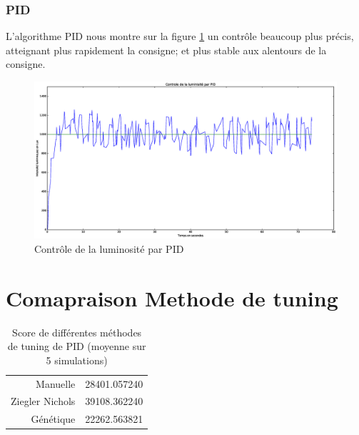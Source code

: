\documentclass[a4paper,10pt]{report}
\begin{document}
\subsubsection{PID}
L'algorithme PID nous montre sur la figure \ref{fig:pid} un contrôle beaucoup plus précis, atteignant plus rapidement la consigne; et plus stable aux alentours de la consigne.
\begin{figure}[hb!]
   \centering
   \includegraphics[scale=0.35]{PID.eps}
   \caption{\label{fig:pid} Contrôle de la luminosité par PID}
\end{figure}


\section{Comapraison Methode de tuning}
\begin{table}[h]
    \begin{center}
        \begin{tabular}{r l}
            Manuelle & 28401.057240\\
            Ziegler Nichols & 39108.362240\\
            Génétique & 22262.563821
        \end{tabular}
    \end{center}
    \caption{Score de différentes méthodes de tuning de PID (moyenne sur 5 simulations)}
\end{table}
\end{document}
